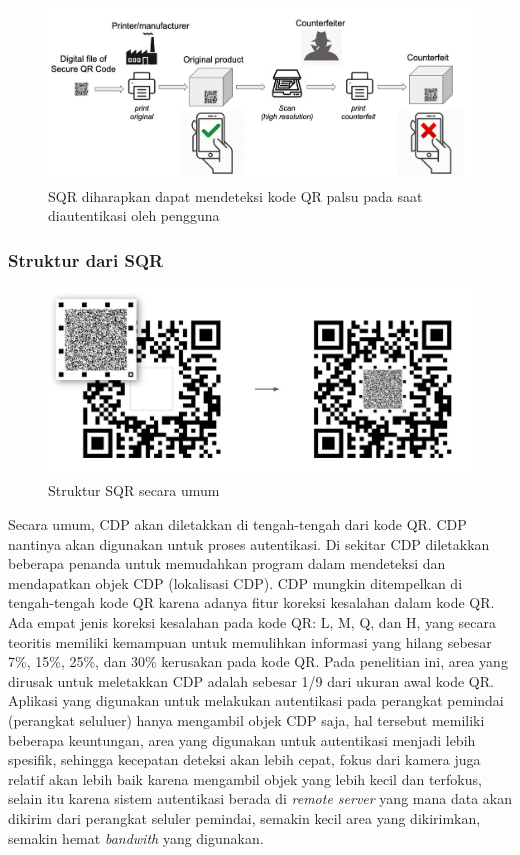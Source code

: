 \begin{figure}[!ht]
	\centering
	\includegraphics[width=12cm]{contents/chapter-2/2-counterveiterpractice.jpg}
	\caption[SQR diharapkan dapat mendeteksi kode QR palsu pada saat diautentikasi oleh pengguna]{SQR diharapkan dapat mendeteksi kode QR palsu pada saat diautentikasi oleh pengguna \cite{picard2021counterfeit}}
	\label{Fig: 2-counterveiterpractice}
\end{figure}

\subsubsection{Struktur dari SQR}
\begin{figure}[h]
	\centering
	\includegraphics[width=12cm]{contents/chapter-2/2-struktursqr.jpg}
	\caption[Struktur SQR secara umum]{Struktur SQR secara umum \cite{picard2021counterfeit}}
	\label{Fig: 2-struktursqr}
\end{figure}

Secara umum, CDP akan diletakkan di tengah-tengah dari kode QR. CDP nantinya akan digunakan untuk proses autentikasi. Di sekitar CDP diletakkan beberapa
penanda untuk memudahkan program dalam mendeteksi dan mendapatkan objek CDP (lokalisasi CDP). CDP mungkin ditempelkan di tengah-tengah kode QR karena adanya
fitur koreksi kesalahan dalam kode QR. Ada empat jenis koreksi kesalahan pada kode QR: L, M, Q, dan H, yang secara teoritis memiliki kemampuan untuk memulihkan
informasi yang hilang sebesar 7\%, 15\%, 25\%, dan 30\% kerusakan pada kode QR. Pada penelitian ini, area yang dirusak untuk meletakkan CDP adalah sebesar 1/9
dari ukuran awal kode QR. Aplikasi yang digunakan untuk melakukan autentikasi pada perangkat pemindai (perangkat seluluer) hanya mengambil objek CDP saja, hal
tersebut memiliki beberapa keuntungan, area yang digunakan untuk autentikasi menjadi lebih spesifik, sehingga kecepatan deteksi akan lebih cepat, fokus dari
kamera juga relatif akan lebih baik karena mengambil objek yang lebih kecil dan terfokus, selain itu karena sistem autentikasi berada di \emph{remote server}
yang mana data akan dikirim dari perangkat seluler pemindai, semakin kecil area yang dikirimkan, semakin hemat \emph{bandwith} yang digunakan.

